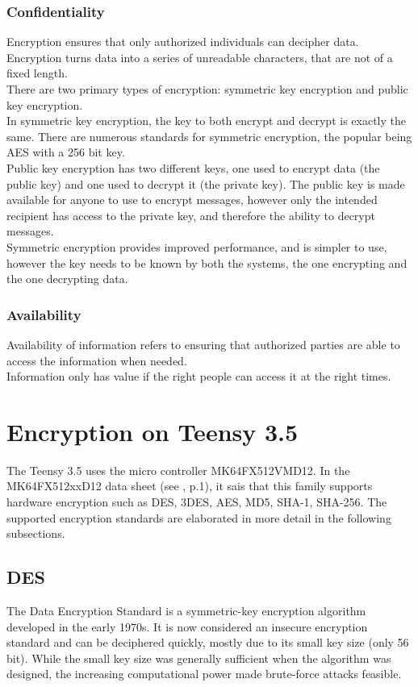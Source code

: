 \subsubsection{Confidentiality}
Encryption ensures that only authorized individuals can decipher data. Encryption turns data into a series of unreadable characters, that are not of a fixed length.\\
There are two primary types of encryption: symmetric key encryption and public key encryption.\\
In symmetric key encryption, the key to both encrypt and decrypt is exactly the same. There are numerous standards for symmetric encryption, the popular being AES with a 256 bit key.\\
Public key encryption has two different keys, one used to encrypt data (the public key) and one used to decrypt it (the private key). The public key is made available for anyone to use to encrypt messages, however only the intended recipient has access to the private key, and therefore the ability to decrypt messages.\\
Symmetric encryption provides improved performance, and is simpler to use, however the key needs to be known by both the systems, the one encrypting and the one decrypting data.\\
\subsubsection{Availability}
Availability of information refers to ensuring that authorized parties are able to access the information when needed.\\
Information only has value if the right people can access it at the right times. 
%
%
%
%
%
\section{Encryption on Teensy 3.5}%
The Teensy 3.5 uses the micro controller MK64FX512VMD12. In the MK64FX512xxD12 data sheet (see \cite{NXP_Datasheet}, p.1), it sais that this family supports hardware encryption such as DES, 3DES, AES, MD5, SHA-1, SHA-256. The supported encryption standards are elaborated in more detail in the following subsections.
%
%
\subsection{DES}
The Data Encryption Standard is a symmetric-key encryption algorithm developed in the early 1970s. It is now considered an insecure encryption standard and can be deciphered quickly, mostly due to its small key size (only 56 bit). \cite{DES_Wikipedia} While the small key size was generally sufficient when the algorithm was designed, the increasing computational power made brute-force attacks feasible. \cite{3DES_Wikipedia}
%
%
